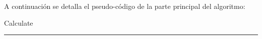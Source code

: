 A continuaci\'on se detalla el pseudo-c\'odigo de la parte principal del algoritmo:

\begin{algorithm}[H]
\caption{Calculate}
\begin{algorithmic}[1]

\EndFunction 
\end{algorithmic}
\hrule
{}
\end{algorithm}

